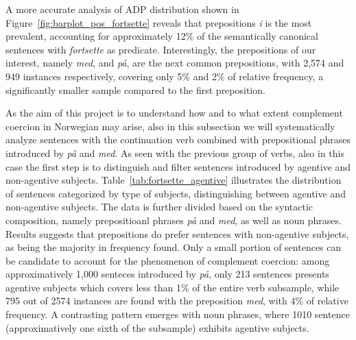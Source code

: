 \documentclass{article}
\begin{document}
\noindent A more accurate analysis of ADP distribution shown in Figure~\ref{fig:barplot_pos_fortsette} reveals that prepositions \emph{i} is the most prevalent, accounting for approximately 12\% of the semantically canonical sentences with \emph{fortsette} as predicate. Interestingly, the prepositions of our interest, namely \emph{med}, and \emph{på}, are the next common prepositions, with 2,574 and 949 instances respectively, covering only 5\% and 2\% of relative frequency, a significantly smaller sample compared to the first preposition. 

As the aim of this project is to understand how and to what extent complement coercion in Norwegian may arise, also in this subsection we will systematically analyze sentences with the continuation verb combined with prepositional phrases introduced by \emph{på} and \emph{med}. As seen with the previous group of verbs, also in this case the first step is to distinguish and filter sentences introduced by agentive and non-agentive subjects. Table~\ref{tab:fortsette_agentive} illustrates the distribution of sentences categorized by type of subjects, distinguishing between agentive and non-agentive subjects. The data is further divided based on the syntactic composition, namely prepositioanl phrases \emph{på} and \emph{med}, as well as noun phrases. Results  suggests that prepositions do prefer sentences with non-agentive subjects, as being the majority in frequency found. Only a small portion of sentences can be candidate to account for the phenomenon of complement coercion: among approximatively 1,000 senteces introduced by \emph{på}, only 213 sentences presents agentive subjects which covers less than 1\% of the entire verb subsample, while 795 out of 2574 instances are found with the preposition \emph{med}, with 4\% of relative frequency. A contrasting pattern emerges with noun phrases, where 1010 sentence (approximatively one sixth of the subsample) exhibits agentive subjects. 
\end{document}
